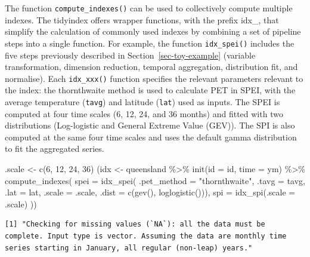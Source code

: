 \documentclass[
]{interact}
\newenvironment{Shaded}{\begin{snugshade}}{\end{snugshade}}
\newcommand{\AttributeTok}[1]{\textcolor[rgb]{0.40,0.45,0.13}{#1}}
\newcommand{\DecValTok}[1]{\textcolor[rgb]{0.68,0.00,0.00}{#1}}
\newcommand{\FunctionTok}[1]{\textcolor[rgb]{0.28,0.35,0.67}{#1}}
\newcommand{\NormalTok}[1]{\textcolor[rgb]{0.00,0.23,0.31}{#1}}
\newcommand{\OtherTok}[1]{\textcolor[rgb]{0.00,0.23,0.31}{#1}}
\newcommand{\SpecialCharTok}[1]{\textcolor[rgb]{0.37,0.37,0.37}{#1}}
\newcommand{\StringTok}[1]{\textcolor[rgb]{0.13,0.47,0.30}{#1}}
\begin{document}
The function \texttt{compute\_indexes()} can be used to collectively
compute multiple indexes. The tidyindex offers wrapper functions, with
the prefix idx\_, that simplify the calculation of commonly used indexes
by combining a set of pipeline steps into a single function. For
example, the function \texttt{idx\_spei()} includes the five steps
previously described in Section~\ref{sec-toy-example} (variable
transformation, dimension reduction, temporal aggregation, distribution
fit, and normalise). Each \texttt{idx\_xxx()} function specifies the
relevant parameters relevant to the index: the thornthwaite method is
used to calculate PET in SPEI, with the average temperature
(\texttt{tavg}) and latitude (\texttt{lat}) used as inputs. The SPEI is
computed at four time scales (6, 12, 24, and 36 months) and fitted with
two distributions (Log-logistic and General Extreme Value (GEV)). The
SPI is also computed at the same four time scales and uses the default
gamma distribution to fit the aggregated series.

\begin{Shaded}
\begin{Highlighting}[]
\NormalTok{.scale }\OtherTok{\textless{}{-}} \FunctionTok{c}\NormalTok{(}\DecValTok{6}\NormalTok{, }\DecValTok{12}\NormalTok{, }\DecValTok{24}\NormalTok{, }\DecValTok{36}\NormalTok{)}
\NormalTok{(idx }\OtherTok{\textless{}{-}}\NormalTok{ queensland }\SpecialCharTok{\%\textgreater{}\%}
  \FunctionTok{init}\NormalTok{(}\AttributeTok{id =}\NormalTok{ id, }\AttributeTok{time =}\NormalTok{ ym) }\SpecialCharTok{\%\textgreater{}\%}
  \FunctionTok{compute\_indexes}\NormalTok{(}
    \AttributeTok{spei =} \FunctionTok{idx\_spei}\NormalTok{(}
      \AttributeTok{.pet\_method =} \StringTok{"thornthwaite"}\NormalTok{, }\AttributeTok{.tavg =}\NormalTok{ tavg, }\AttributeTok{.lat =}\NormalTok{ lat,}
      \AttributeTok{.scale =}\NormalTok{ .scale, }\AttributeTok{.dist =} \FunctionTok{c}\NormalTok{(}\FunctionTok{gev}\NormalTok{(), }\FunctionTok{loglogistic}\NormalTok{())),}
    \AttributeTok{spi =} \FunctionTok{idx\_spi}\NormalTok{(}\AttributeTok{.scale =}\NormalTok{ .scale)}
\NormalTok{  ))}
\end{Highlighting}
\end{Shaded}

\begin{verbatim}
[1] "Checking for missing values (`NA`): all the data must be complete. Input type is vector. Assuming the data are monthly time series starting in January, all regular (non-leap) years."
\end{verbatim}
\end{document}
